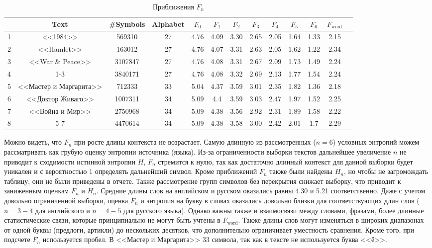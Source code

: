 \documentclass[a4paper,12pt]{article}
\begin{document}
	\begin{table}[h!]
		\centering
	\begin{tabular}{|c|c|c|c|c|c|c|c|c|c|c|c|c|}
		\hline
		& Text & \#Symbols & Alphabet & $F_0$ & $F_1 $ & $F_2$ & $F_3$ & $F_4$ & $F_5$ & $F_6$ & $F_{\text{word}}$ \\
		\hline
		1 & <<1984>> & 569310 & 27 & 4.76 & 4.09 &  3.30 & 2.65 & 2.05 & 1.64 & 1.33 & 2.15 \\
		\hline
		2 & <<Hamlet>> & 163012 & 27 & 4.76 & 4.07 & 3.31 & 2.63 & 2.05 & 1.62 & 1.22 &  2.34 \\
		\hline
		3 &<<War \& Peace>> & 3107847 & 27 & 4.76 &  4.08 & 3.31 & 2.67 & 2.09 & 1.73 & 1.49 & 2.24 \\
		\hline
		4 & 1-3 & 3840171 & 27 & 4.76 & 4.08 & 3.32 & 2.69 & 2.13 & 1.77 &  1.54 & 2.24 \\
		\hline
		5 & <<Мастер и Маргарита>> & 712333 & 33 & 5.04 & 4.37 & 3.59 & 3.01 & 2.35 & 1.82 & 1.36 & 2.18\\
		\hline
		6 & <<Доктор Живаго>> & 1007311 & 34 & 5.09 & 4.4 & 3.59 & 3.03 & 2.47 & 1.97 & 1.52 & 2.25\\
		\hline
		7 & <<Война и Мир>> & 2750968 & 34 & 5.09 & 4.38 & 3.56 & 2.92 & 2.31 & 1.89 & 1.58 & 2.22 \\
		\hline
		8 & 5-7 & 4470614 & 34 & 5.09 & 4.38 & 3.58 & 3.00 & 2.42 & 2.01 &  1.7 & 2.29\\
		\hline
	\end{tabular}
	\caption{Приближения $F_n$}
	\label{table:Fn}
	\end{table}

	Можно видеть, что $F_n$ при росте длины контекста не возрастает. Самую длинную из рассмотренных ($ n=6 $) условных энтропий можем рассматривать как грубую оценку энтропии источника (языка). Из-за ограниченности выборки текстов дальнейшее увеличение $ n $ не приводит к сходимости истинной энтропии $ H $, $F_n$ стремится к нулю, так как достаточно длинный контекст для данной выборки будет уникален и с вероятностью 1 определять дальнейший символ. Кроме приближений $F_n$ также были найдены $ H_n $, но чтобы не загромождать таблицу, они не были приведены в отчете. Также рассмотрение групп символов без перекрытия снижает выборку, что приводит к заниженным оценкам $F_n$ и  $H_n$. Средние длины слов на английском и русском оказались равны 4.30 и 5.21 соответственно. Даже с учетом довольно ограниченной выборки, оценка $ F_n $ и энтропия на букву в словах оказались довольно близки для соответствующих длин слов ($ n=3-4$ для английского и $ n=4-5$ для русского языка). Однако важны также и взаимосвязи между словами, фразами, более длинные статистические связи, которые принципиально не могут быть учтены в $F_{\text{word}}$. Также длины слов могут изменяться в широких диапазонах от одной буквы (предлоги, артикли) до нескольких десятков, что дополнительно ограничивает уместность сравнения. Кроме того, при подсчете $F_n$ используется пробел. В <<Мастер и Маргарита>> 33 символа, так как в тексте не используется буква <<ё>>.
\end{document}
